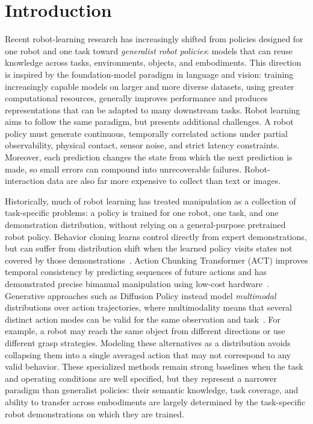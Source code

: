 \documentclass[10pt,conference]{IEEEtran}
\begin{document}
\section{Introduction}
\label{sec:introduction}

Recent robot-learning research has increasingly shifted from policies designed
for one robot and one task toward \emph{generalist robot policies}: models that
can reuse knowledge across tasks, environments, objects, and embodiments.
This direction is inspired by the foundation-model paradigm in language and
vision: training increasingly capable models on larger and more diverse
datasets, using greater computational resources, generally improves performance
and produces representations that can be adapted to many downstream tasks.
Robot learning aims to follow the same paradigm, but presents additional challenges. A robot policy must generate continuous, temporally correlated actions under partial observability, physical contact, sensor noise, and strict latency constraints. Moreover, each prediction changes the state from which the next prediction is made, so small errors can compound into unrecoverable failures. Robot-interaction data are also far more expensive to collect than text or images.

Historically, much of robot learning has treated manipulation as a collection
of task-specific problems: a policy is trained for one robot, one task, and one
demonstration distribution, without relying on a general-purpose pretrained
robot policy. Behavior cloning learns control directly from expert
demonstrations, but can suffer from distribution shift when the learned policy
visits states not covered by those demonstrations~\cite{ross2011dagger}. Action
Chunking Transformer (ACT) improves temporal consistency by predicting sequences
of future actions and has demonstrated precise bimanual manipulation using
low-cost hardware~\cite{zhao2023act}. Generative approaches such as Diffusion
Policy instead model \emph{multimodal} distributions over action trajectories,
where multimodality means that several distinct action modes can be valid for
the same observation and task~\cite{chi2023diffusion}. For example, a robot may
reach the same object from different directions or use different grasp
strategies. Modeling these alternatives as a distribution avoids collapsing
them into a single averaged action that may not correspond to any valid
behavior. These specialized
methods remain strong baselines when the task and operating conditions are well
specified, but they represent a narrower paradigm than generalist policies:
their semantic knowledge, task coverage, and ability to transfer across
embodiments are largely determined by the task-specific robot demonstrations on
which they are trained.
\end{document}
